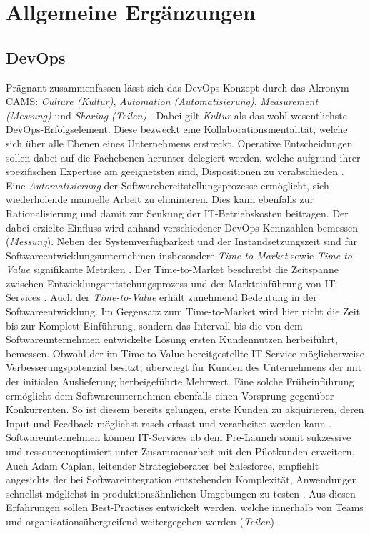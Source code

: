\section{Allgemeine Ergänzungen}
\subsection{DevOps}
\label{sec:DevOps}
Prägnant zusammenfassen lässt sich das DevOps-Konzept durch das Akronym CAMS: \textit{Culture (Kultur)}, \textit{Automation (Automatisierung)}, \textit{Measurement (Messung)} und \textit{Sharing (Teilen)} \cite[5]{Halstenberg.2020}. Dabei gilt \textit{Kultur} als das wohl wesentlichste DevOps-Erfolgselement. Diese bezweckt eine Kollaborationsmentalität, welche sich über alle Ebenen eines Unternehmens erstreckt. Operative Entscheidungen sollen dabei auf die Fachebenen herunter delegiert werden, welche aufgrund ihrer spezifischen Expertise am geeignetsten sind, Dispositionen zu verabschieden \cite[5]{Halstenberg.2020}. Eine \textit{Automatisierung} der Softwarebereitstellungsprozesse ermöglicht, sich wiederholende manuelle Arbeit zu eliminieren. Dies kann ebenfalls zur Rationalisierung und damit zur Senkung der IT-Betriebskosten beitragen. Der dabei erzielte Einfluss wird anhand verschiedener DevOps-Kennzahlen bemessen (\textit{Messung}). Neben der Systemverfügbarkeit und der Instandsetzungszeit sind für Softwareentwicklungsunternehmen insbesondere \textit{Time-to-Market} sowie \textit{Time-to-Value} signifikante Metriken \cite[7]{Halstenberg.2020}. 
Der Time-to-Market beschreibt die Zeitspanne zwischen Entwicklungsentstehungsprozess und der Markteinführung von IT-Services \cite[141]{Vesey.1992}. Auch der \textit{Time-to-Value} erhält zunehmend Bedeutung in der Softwareentwicklung. Im Gegensatz zum Time-to-Market wird hier nicht die Zeit bis zur Komplett-Einführung, sondern das Intervall bis die von dem Softwareunternehmen entwickelte Lösung ersten Kundennutzen herbeiführt, bemessen. Obwohl der im Time-to-Value bereitgestellte IT-Service möglicherweise Verbesserungspotenzial besitzt, überwiegt für Kunden des Unternehmens der mit der initialen Auslieferung herbeigeführte Mehrwert. Eine solche Früheinführung ermöglicht dem Softwareunternehmen ebenfalls einen Vorsprung gegenüber Konkurrenten. So ist diesem bereits gelungen, erste Kunden zu akquirieren, deren Input und Feedback möglichst rasch erfasst und verarbeitet werden kann \cite[9]{Halstenberg.2020}. Softwareunternehmen können IT-Services ab dem Pre-Launch somit sukzessive und ressourcenoptimiert unter Zusammenarbeit mit den Pilotkunden erweitern. Auch Adam Caplan, leitender Strategieberater bei Salesforce, empfiehlt angesichts der bei Softwareintegration entstehenden Komplexität, Anwendungen schnellst möglichst in produktionsähnlichen Umgebungen zu testen \cite{Vesey.1992}. Aus diesen Erfahrungen sollen Best-Practises entwickelt werden, welche innerhalb von Teams und organisationsübergreifend weitergegeben werden (\textit{Teilen}) \cite[7]{Halstenberg.2020}. 


